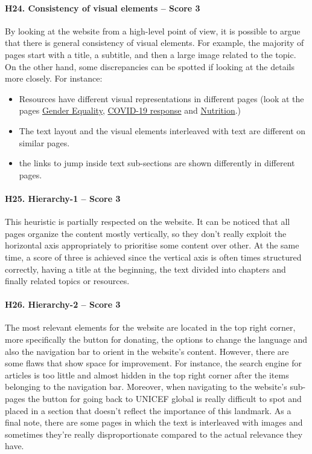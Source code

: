 \paragraph*{H24. Consistency of visual elements – Score 3}
By looking at the website from a high-level point of view, it is possible to argue that there is general consistency of visual elements. For example, the majority of pages start with a title, a subtitle, and then a large image related to the topic. On the other hand, some discrepancies can be spotted if looking at the details more closely. 
For instance:
\begin{itemize}
	\item Resources have different visual representations in different pages (look at the pages \href{https://www.unicef.org/gender-equality}{Gender Equality}, \href{https://www.unicef.org/coronavirus/covid-19}{COVID-19 response} and \href{https://www.unicef.org/nutrition}{Nutrition}.)
	\item The text layout and the visual elements interleaved with text are different on similar pages.
	\item the links to jump inside text sub-sections are shown differently in different pages.
\end{itemize}

\paragraph*{H25. Hierarchy-1 – Score 3}
This heuristic is partially respected on the website. It can be noticed that all pages organize the content mostly vertically, so they don't really exploit the horizontal axis appropriately to prioritise some content over other. At the same time, a score of three is achieved since the vertical axis is often times structured correctly, having a title at the beginning, the text divided into chapters and finally related topics or resources.


\paragraph*{H26. Hierarchy-2 – Score 3}
The most relevant elements for the website are located in the top right corner, more specifically the button for donating, the options to change the language and also the navigation bar to orient in the website's content.
However, there are some flaws that show space for improvement. For instance, the search engine for articles is too little and almost hidden in the top right corner after the items belonging to the navigation bar. Moreover, when navigating to the website's sub-pages the button for going back to UNICEF global is really difficult to spot and placed in a section that doesn't reflect the importance of this landmark.
As a final note, there are some pages in which the text is interleaved with images and sometimes they're really disproportionate compared to the actual relevance they have.





